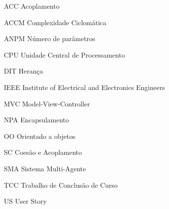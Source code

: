 \begin{siglas}

\item [ACC] Acoplamento
\item [ACCM] Complexidade Ciclomática
\item [ANPM] Número de parâmetros
\item [CPU] Unidade Central de Processamento
\item [DIT] Herança
\item [IEEE] Institute of Electrical and Electronics Engineers
\item [MVC] Model-View-Controller
\item [NPA] Encapsulamento
\item [OO] Orientado a objetos
\item [SC] Coesão e Acoplamento
\item [SMA] Sistema Multi-Agente
\item [TCC] Trabalho de Conclusão de Curso
\item [US] User Story
\end{siglas}
